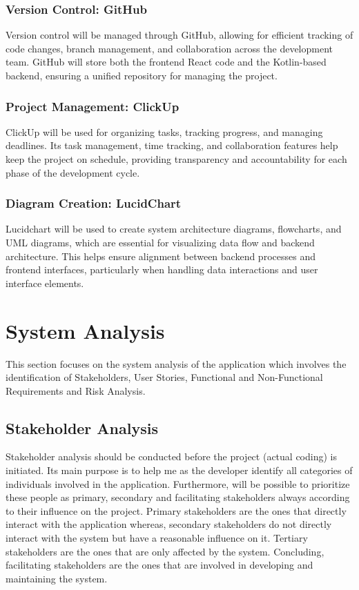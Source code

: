 \documentclass{article}
\begin{document}
\subsubsection{Version Control: GitHub}
Version control will be managed through GitHub, allowing for efficient tracking of code changes, branch management, and collaboration across the development team. GitHub will store both the frontend React code and the Kotlin-based backend, ensuring a unified repository for managing the project.

\subsubsection{Project Management: ClickUp}
ClickUp will be used for organizing tasks, tracking progress, and managing deadlines. Its task management, time tracking, and collaboration features help keep the project on schedule, providing transparency and accountability for each phase of the development cycle.

\subsubsection{Diagram Creation: LucidChart}
Lucidchart will be used to create system architecture diagrams, flowcharts, and UML diagrams, which are essential for visualizing data flow and backend architecture. This helps ensure alignment between backend processes and frontend interfaces, particularly when handling data interactions and user interface elements.


\newpage

\fancyhead[L]{} 

\section{System Analysis}

This section focuses on the system analysis of the application which involves the identification of Stakeholders, User Stories, Functional and Non-Functional Requirements and Risk Analysis. 

\subsection{Stakeholder Analysis}

Stakeholder analysis should be conducted before the project (actual coding)
is initiated. Its main purpose is to help me as the developer identify all categories of individuals involved in the application. Furthermore, will be possible
to prioritize these people as primary, secondary and facilitating stakeholders
always according to their influence on the project. Primary stakeholders are
the ones that directly interact with the application whereas, secondary stakeholders do not directly interact with the system but have a reasonable influence
on it. Tertiary stakeholders are the ones that are only affected by the system. Concluding, facilitating stakeholders are the ones that are involved in
developing and maintaining the system. \cite{termscompared2019}
\end{document}
